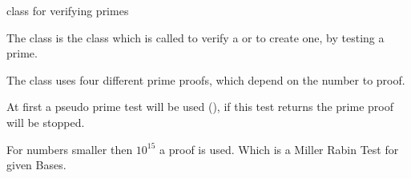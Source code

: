 


\NAME

\dotfill class for verifying primes



\ABSTRACT

The class 
is the class which is called to verify a  or to create one, by
testing a prime.



\DESCRIPTION

The class  uses four different prime proofs, which depend on the 
number to proof.

At first a pseudo prime test will be used (), if this test returns 
the prime proof will be stopped.

For numbers smaller then $10^{15}$ a  proof is used. Which is a Miller Rabin Test for given Bases.

